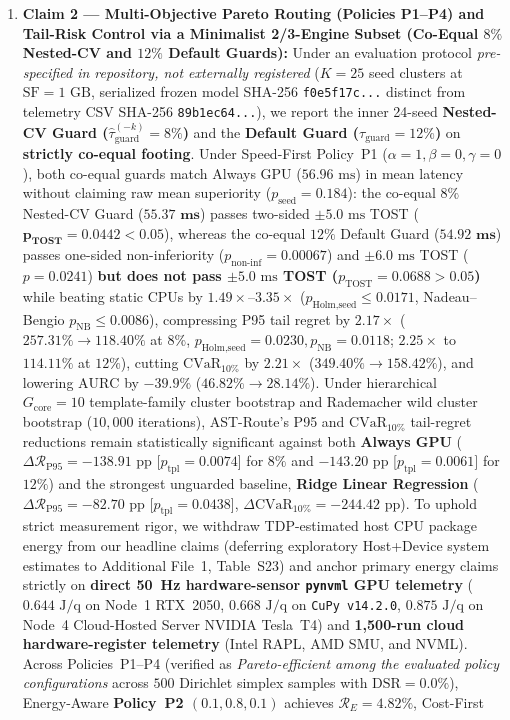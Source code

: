 \documentclass[10pt,a4paper]{article}
\begin{document}
\begin{enumerate}[leftmargin=1.5em,itemsep=3pt]
    \item \textbf{Claim 2 --- Multi-Objective Pareto Routing (Policies P1--P4) and Tail-Risk Control via a Minimalist 2/3-Engine Subset (Co-Equal $8\%$ Nested-CV and $12\%$ Default Guards):} Under an evaluation protocol \emph{pre-specified in repository, not externally registered} ($K=25$ seed clusters at $\text{SF}=1\text{ GB}$, serialized frozen model SHA-256 \texttt{f0e5f17c...} distinct from telemetry CSV SHA-256 \texttt{89b1ec64...}), we report the inner 24-seed \textbf{Nested-CV Guard ($\hat{\tau}_{\text{guard}}^{(-k)}=8\%$)} and the \textbf{Default Guard ($\tau_{\text{guard}}=12\%$)} on \textbf{strictly co-equal footing}. Under Speed-First Policy~P1 ($\alpha=1,\beta=0,\gamma=0$), both co-equal guards match Always GPU ($56.96\text{ ms}$) in mean latency without claiming raw mean superiority ($p_{\text{seed}}=0.184$): the co-equal $8\%$ Nested-CV Guard ($\mathbf{55.37\text{ ms}}$) passes two-sided $\pm 5.0\text{ ms}$ TOST ($\mathbf{p_{\text{TOST}}=0.0442 < 0.05}$), whereas the co-equal $12\%$ Default Guard ($\mathbf{54.92\text{ ms}}$) passes one-sided non-inferiority ($p_{\text{non-inf}}=0.00067$) and $\pm 6.0\text{ ms}$ TOST ($p=0.0241$) \textbf{but does not pass $\pm 5.0\text{ ms}$ TOST ($p_{\text{TOST}}=0.0688 > 0.05$)} while beating static CPUs by $1.49\times\text{--}3.35\times$ ($p_{\text{Holm,seed}}\le 0.0171$, Nadeau--Bengio $p_{\text{NB}}\le 0.0086$), compressing P95 tail regret by $\mathbf{2.17\times}$ ($257.31\% \rightarrow \mathbf{118.40\%}$ at $8\%$, $p_{\text{Holm,seed}}=0.0230, p_{\text{NB}}=0.0118$; $\mathbf{2.25\times}$ to $\mathbf{114.11\%}$ at $12\%$), cutting $\text{CVaR}_{10\%}$ by $\mathbf{2.21\times}$ ($349.40\% \rightarrow \mathbf{158.42\%}$), and lowering $\text{AURC}$ by $\mathbf{-39.9\%}$ ($46.82\% \rightarrow 28.14\%$). Under hierarchical $G_{\text{core}}=10$ template-family cluster bootstrap and Rademacher wild cluster bootstrap ($10{,}000$ iterations), AST-Route's P95 and $\text{CVaR}_{10\%}$ tail-regret reductions remain statistically significant against both \textbf{Always GPU} ($\Delta\mathcal{R}_{\text{P95}}=-138.91\text{ pp}$ [$p_{\text{tpl}}=0.0074$] for $8\%$ and $-143.20\text{ pp}$ [$p_{\text{tpl}}=0.0061$] for $12\%$) and the strongest unguarded baseline, \textbf{Ridge Linear Regression} ($\Delta\mathcal{R}_{\text{P95}}=-82.70\text{ pp}$ [$p_{\text{tpl}}=0.0438$], $\Delta\text{CVaR}_{10\%}=-244.42\text{ pp}$). To uphold strict measurement rigor, we withdraw TDP-estimated host CPU package energy from our headline claims (deferring exploratory Host+Device system estimates to Additional File~1, Table~S23) and anchor primary energy claims strictly on \textbf{direct 50~Hz hardware-sensor \texttt{pynvml} GPU telemetry} ($0.644\text{ J/q}$ on Node~1 RTX~2050, $0.668\text{ J/q}$ on \texttt{CuPy v14.2.0}, $0.875\text{ J/q}$ on Node~4 Cloud-Hosted Server NVIDIA Tesla~T4) and \textbf{1,500-run cloud hardware-register telemetry} (Intel RAPL, AMD SMU, and NVML). Across Policies~P1--P4 (verified as \emph{Pareto-efficient among the evaluated policy configurations} across $500$ Dirichlet simplex samples with $\text{DSR}=\mathbf{0.0\%}$), Energy-Aware \textbf{Policy~P2 $(0.1,0.8,0.1)$} achieves $\mathcal{R}_E=4.82\%$, Cost-First 
\end{enumerate}
\end{document}
